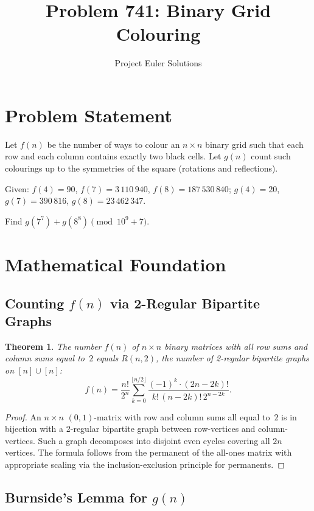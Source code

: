 \documentclass[11pt]{article}
\title{Problem 741: Binary Grid Colouring}
\author{Project Euler Solutions}
\date{}
\newtheorem{theorem}{Theorem}
\theoremstyle{definition}
\begin{document}
\maketitle

\section{Problem Statement}

Let $f(n)$ be the number of ways to colour an $n \times n$ binary grid such that each row and each column contains exactly two black cells. Let $g(n)$ count such colourings up to the symmetries of the square (rotations and reflections).

Given: $f(4)=90$, $f(7)=3\,110\,940$, $f(8)=187\,530\,840$; $g(4)=20$, $g(7)=390\,816$, $g(8)=23\,462\,347$.

Find $g(7^7)+g(8^8) \pmod{10^9+7}$.

\section{Mathematical Foundation}

\subsection{Counting $f(n)$ via 2-Regular Bipartite Graphs}

\begin{theorem}
The number $f(n)$ of $n \times n$ binary matrices with all row sums and column sums equal to~$2$ equals $R(n,2)$, the number of 2-regular bipartite graphs on $[n] \cup [n]$:
\[
f(n) = \frac{n!}{2^n} \sum_{k=0}^{\lfloor n/2 \rfloor} \frac{(-1)^k \cdot (2n-2k)!}{k!\,(n-2k)!\,2^{n-2k}}.
\]
\end{theorem}

\begin{proof}
An $n \times n$ $(0,1)$-matrix with row and column sums all equal to~$2$ is in bijection with a 2-regular bipartite graph between row-vertices and column-vertices. Such a graph decomposes into disjoint even cycles covering all $2n$ vertices. The formula follows from the permanent of the all-ones matrix with appropriate scaling via the inclusion-exclusion principle for permanents.
\end{proof}

\subsection{Burnside's Lemma for $g(n)$}
\end{document}
